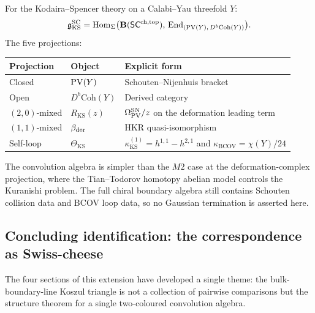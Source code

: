 \begin{computation}
For the Kodaira--Spencer theory on a Calabi--Yau threefold $Y$:
\begin{equation}%
\gSC_{\mathrm{KS}}
= \Hom_{\Sigma}\bigl(
\mathbf{B}(\SCop),\,
\End_{(\PV(Y),\,D^b\mathrm{Coh}(Y))}
\bigr).
\end{equation}
The five projections:
\begin{center}
\renewcommand{\arraystretch}{1.25}
\begin{tabular}{lll}
\textbf{Projection} & \textbf{Object} & \textbf{Explicit form} \\
\hline
Closed & $\operatorname{PV}(Y)$ & Schouten--Nijenhuis bracket \\
Open & $D^b\mathrm{Coh}(Y)$ & Derived category \\
$(2,0)$-mixed & $R_{\mathrm{KS}}(z)$
& $\Omega_{\operatorname{PV}}^{\mathrm{SN}}/z$ on the deformation leading term \\
$(1,1)$-mixed & $\beta_{\mathrm{der}}$
& HKR quasi-isomorphism \\
Self-loop & $\Theta_{\mathrm{KS}}$
& $\kappa_{\mathrm{KS}}^{(1)}=h^{1,1}-h^{2,1}$ and
$\kappa_{\mathrm{BCOV}}=\chi(Y)/24$
\end{tabular}
\end{center}
The convolution algebra is simpler than the $M2$ case at the
deformation-complex projection, where the Tian--Todorov homotopy
abelian model controls the Kuranishi problem. The full chiral
boundary algebra still contains Schouten collision data and BCOV
loop data, so no Gaussian termination is asserted here.
\end{computation}


\subsection{Concluding identification: the correspondence as Swiss-cheese}

The four sections of this extension have developed a single theme:
the bulk-boundary-line Koszul triangle is not a collection of
pairwise comparisons but the structure theorem for a single
two-coloured convolution algebra.

